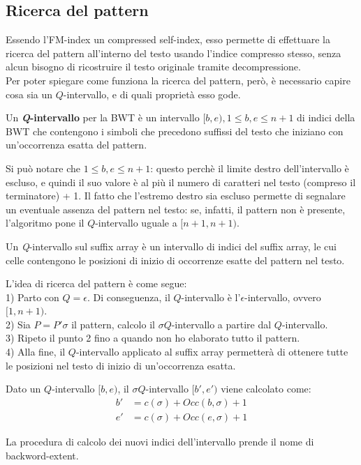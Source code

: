 \subsection*{Ricerca del pattern}
Essendo l'FM-index un compressed self-index, esso permette di effettuare
la ricerca del pattern all'interno del testo usando l'indice compresso stesso,
senza alcun bisogno di ricostruire il testo originale tramite decompressione.\\
Per poter spiegare come funziona la ricerca del pattern, però, è necessario
capire cosa sia un $Q$-intervallo, e di quali proprietà esso gode.
\begin{defn}
    Un \textbf{\textit{Q}-intervallo} per la BWT è un intervallo
    $[b,e), 1 \le b,e \le n+1$ di indici della BWT che contengono i simboli
    che precedono suffissi del testo che iniziano con un'occorrenza
    esatta del pattern.
\end{defn}
\begin{rem}
    Si può notare che $1 \le b,e \le n+1$: questo perchè il limite destro
    dell'intervallo è escluso, e quindi il suo valore è al più il
    numero di caratteri nel testo (compreso il terminatore) + 1.
    Il fatto che l'estremo destro sia escluso permette di segnalare
    un eventuale assenza del pattern nel testo: se, infatti, il pattern non è
    presente, l'algoritmo pone il $Q$-intervallo uguale a $[n+1, n+1)$.
\end{rem}
\begin{defn}
    Un \textit{Q}-intervallo sul suffix array è un intervallo di indici
    del suffix array, le cui celle contengono le posizioni di inizio
    di occorrenze esatte del pattern nel testo.
\end{defn}

L'idea di ricerca del pattern è come segue:\\
1) Parto con $Q = \epsilon$. Di conseguenza, il $Q$-intervallo è
l'$\epsilon$-intervallo, ovvero $[1,n+1)$.\\
2) Sia $P = P'\sigma$ il pattern, calcolo il $\sigma Q$-intervallo a partire
dal $Q$-intervallo.\\
3) Ripeto il punto 2 fino a quando non ho elaborato tutto il pattern.\\
4) Alla fine, il $Q$-intervallo applicato al suffix array permetterà di
ottenere tutte le posizioni nel testo di inizio di un'occorrenza esatta.\\

\begin{thm}
    Dato un $Q$-intervallo $[b,e)$, il $\sigma Q$-intervallo $[b',e')$ viene calcolato
    come:
    \begin{align*}
        b' &= c(\sigma) + Occ(b, \sigma) + 1\\
        e' &= c(\sigma) + Occ(e, \sigma) + 1
    \end{align*}
\end{thm}
La procedura di calcolo dei nuovi indici dell'intervallo prende il nome di
backword-extent.
